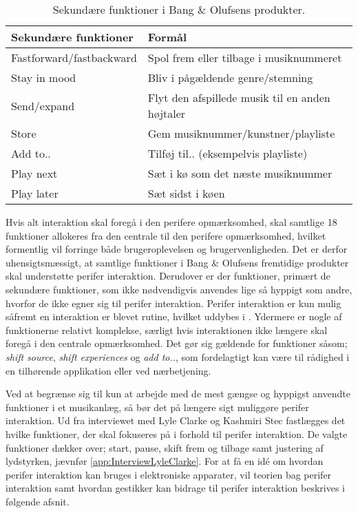 \noindent
%
%
\begin{table}[H]
	\centering
	\begin{tabular}{ | l | p{8cm} |}
		\hline
		\multicolumn{1}{|l|}{\textbf{Sekundære funktioner}} & \multicolumn{1}{l|}{\textbf{Formål}} \\ \hline
		Fastforward/fastbackward & Spol frem eller tilbage i musiknummeret \\ \hline
		Stay in mood & Bliv i pågældende genre/stemning \\ \hline
		Send/expand & Flyt den afspillede musik til en anden højtaler \\ \hline
		Store & Gem musiknummer/kunstner/playliste \\ \hline
		Add to.. & Tilføj til.. (eksempelvis playliste) \\ \hline
		Play next & Sæt i kø som det næste musiknummer \\ \hline
		Play later & Sæt sidst i køen \\ \hline
	\end{tabular}
	\caption{Sekundære funktioner i Bang $\&$ Olufsens produkter.}
	\label{tab:BogOsSekundaereFunktioner}
\end{table}
\noindent
%
Hvis alt interaktion skal foregå i den perifere opmærksomhed, skal samtlige 18 funktioner allokeres fra den centrale til den perifere opmærksomhed, hvilket formentlig vil forringe både brugeroplevelsen og brugervenligheden. Det er derfor uhensigtsmæssigt, at samtlige funktioner i Bang $\&$ Olufsens fremtidige produkter skal understøtte perifer interaktion. Derudover er der funktioner, primært de sekundære funktioner, som ikke nødvendigvis anvendes lige så hyppigt som andre, hvorfor de ikke egner sig til perifer interaktion. Perifer interaktion er kun mulig såfremt en interaktion er blevet rutine, hvilket uddybes i . Ydermere er nogle af funktionerne relativt komplekse, særligt hvis interaktionen ikke længere skal foregå i den centrale opmærksomhed. Det gør sig gældende for funktioner såsom; \textit{shift source}, \textit{shift experiences} og \textit{add to..}, som fordelagtigt kan være til rådighed i en tilhørende applikation eller ved nærbetjening.  

Ved at begrænse sig til kun at arbejde med de mest gængse og hyppigst anvendte funktioner i et musikanlæg, så bør det på længere sigt muliggøre perifer interaktion. Ud fra interviewet med Lyle Clarke og Kashmiri Stec fastlægges det hvilke funktioner, der skal fokuseres på i forhold til perifer interaktion. De valgte funktioner dækker over; start, pause, skift frem og tilbage samt justering af lydstyrken, jævnfør \autoref{app:InterviewLyleClarke}.\blankline
%
For at få en idé om hvordan perifer interaktion kan bruges i elektroniske apparater, vil teorien bag perifer interaktion samt hvordan gestikker kan bidrage til perifer interaktion beskrives i følgende afsnit. 

